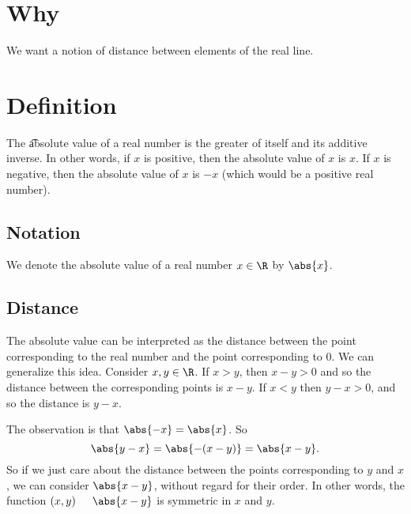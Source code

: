 
\section*{Why}

We want a notion of distance between elements of the real line.

\section*{Definition}


The \t{absolute value} of a real number is the greater of itself and its additive inverse.
In other words, if $x$ is positive, then the absolute value of $x$ is $x$.
If $x$ is negative, then the absolute value of $x$ is $-x$ (which would be a positive real number).

\subsection*{Notation}

We denote the absolute value of a real number $x \in \R $ by $\abs{x}$.


\subsection*{Distance}

The absolute value can be interpreted as the distance between the point corresponding to the real number and the point corresponding to 0.
We can generalize this idea.
Consider $x, y \in \R $.
If $x > y$, then $x - y > 0$ and so the distance between the corresponding points is $x - y$.
If $x < y$ then $y - x > 0$, and so the distance is $y - x$.

The observation is that $\abs{-x} = \abs{x}$.
So
  \[
\abs{y - x} = \abs{-(x - y)} = \abs{x-y}.
  \]
So if we just care about the distance between the points corresponding to $y$ and $x$, we can consider $\abs{x - y}$, without regard for their order.
In other words, the function $(x, y) \indent \abs{x - y}$ is symmetric in $x$ and $y$.

\blankpage